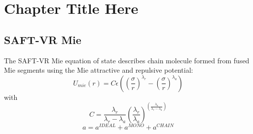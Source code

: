 
\chapter{Chapter Title Here} %

\label{ChapterX} %


\section{SAFT-VR Mie}

The SAFT-VR Mie equation of state \cite{abntex2classe} describes chain molecule formed from fused Mie segments using the Mie attractive and repulsive potential: 
\begin{equation}
U_{mie}(r) = C\epsilon \left( \left(\frac{\sigma}{r} \right)^{\lambda_r} - \left(\frac{\sigma}{r} \right)^{\lambda_a} \right)
\label{eqn:miepotential}
\end{equation}
with
\begin{equation}
C = \frac{\lambda_r}{\lambda_r - \lambda_a} \left(\frac{\lambda_r}{\lambda_a} \right)^{\left( \frac{\lambda_a}{\lambda_r - \lambda_a} \right)}
\label{eqn:coefmie}
\end{equation}
\begin{equation}
a = a^{IDEAL} + a^{MONO} + a^{CHAIN}
\label{eqn:miehelm}
\end{equation}
